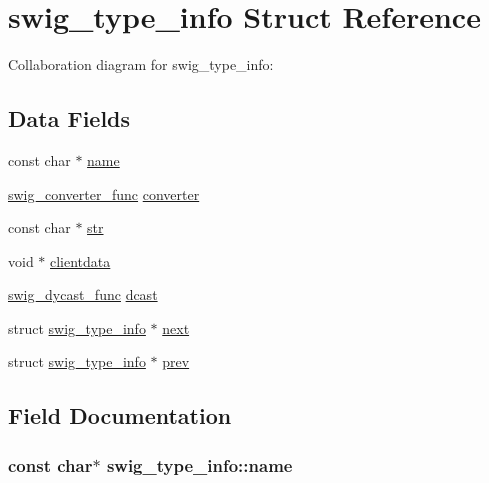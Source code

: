 \hypertarget{structswig__type__info}{
\section{swig\_\-type\_\-info Struct Reference}
\label{structswig__type__info}
}
Collaboration diagram for swig\_\-type\_\-info:\subsection*{Data Fields}
\begin{CompactItemize}
\item 
const char $\ast$ \hyperlink{structswig__type__info_90a9c6a25aa3e923978005ecbe23ad60}{name}
\item 
\hyperlink{pso__wrap_8cpp_fc1fbb8eefe5ef47d8c6c4b5dcf0ce4a}{swig\_\-converter\_\-func} \hyperlink{structswig__type__info_355c576100fcadcc7f75ade38fa85c24}{converter}
\item 
const char $\ast$ \hyperlink{structswig__type__info_bbe7cc58a083feb4329b748643324064}{str}
\item 
void $\ast$ \hyperlink{structswig__type__info_19bdd65dceb89cd54befd3ded06558b7}{clientdata}
\item 
\hyperlink{pso__wrap_8cpp_d9f16e529633c78df7a780b9749395ce}{swig\_\-dycast\_\-func} \hyperlink{structswig__type__info_07df4bedf85be77b23756b531b60e0dd}{dcast}
\item 
struct \hyperlink{structswig__type__info}{swig\_\-type\_\-info} $\ast$ \hyperlink{structswig__type__info_6c16b30e9cd94004bb71d92bfc859ee5}{next}
\item 
struct \hyperlink{structswig__type__info}{swig\_\-type\_\-info} $\ast$ \hyperlink{structswig__type__info_06770670038822319b2a1ce1e69786b7}{prev}
\end{CompactItemize}


\subsection{Field Documentation}
\hypertarget{structswig__type__info_90a9c6a25aa3e923978005ecbe23ad60}{
\subsubsection{\setlength{\rightskip}{0pt plus 5cm}const char$\ast$ {\bf swig\_\-type\_\-info::name}}}
\label{structswig__type__info_90a9c6a25aa3e923978005ecbe23ad60}


